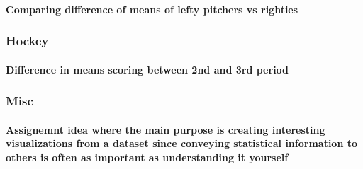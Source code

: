 \documentclass[]{article}
\let\oldparagraph\paragraph
\renewcommand{\paragraph}[1]{\oldparagraph{#1}\mbox{}}
\begin{document}
\hypertarget{comparing-difference-of-means-of-lefty-pitchers-vs-righties}{%
\paragraph{Comparing difference of means of lefty pitchers vs
righties}\label{comparing-difference-of-means-of-lefty-pitchers-vs-righties}}

\hypertarget{hockey}{%
\subsubsection{Hockey}\label{hockey}}

\hypertarget{difference-in-means-scoring-between-2nd-and-3rd-period}{%
\paragraph{Difference in means scoring between 2nd and 3rd
period}\label{difference-in-means-scoring-between-2nd-and-3rd-period}}

\hypertarget{misc}{%
\subsubsection{Misc}\label{misc}}

\hypertarget{assignemnt-idea-where-the-main-purpose-is-creating-interesting-visualizations-from-a-dataset-since-conveying-statistical-information-to-others-is-often-as-important-as-understanding-it-yourself}{%
\paragraph{Assignemnt idea where the main purpose is creating
interesting visualizations from a dataset since conveying statistical
information to others is often as important as understanding it
yourself}\label{assignemnt-idea-where-the-main-purpose-is-creating-interesting-visualizations-from-a-dataset-since-conveying-statistical-information-to-others-is-often-as-important-as-understanding-it-yourself}}
\end{document}
